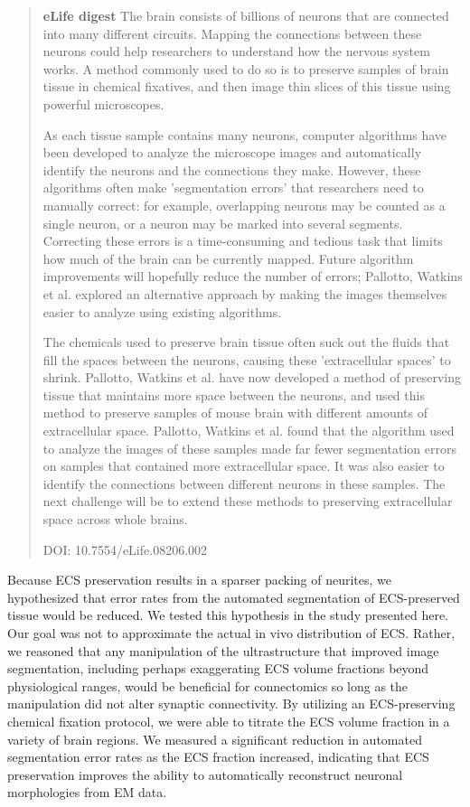 \documentclass{article}
\begin{document}
\begin{quote}
\noindent\textbf{eLife digest} The brain consists of billions of neurons that are connected into many different circuits. Mapping the connections between these neurons could help researchers to understand how the nervous system works. A method commonly used to do so is to preserve samples of brain tissue in chemical fixatives, and then image thin slices of this tissue using powerful microscopes.

As each tissue sample contains many neurons, computer algorithms have been developed to analyze the microscope images and automatically identify the neurons and the connections they make. However, these algorithms often make ’segmentation errors’ that researchers need to manually correct: for example, overlapping neurons may be counted as a single neuron, or a neuron may be marked into several segments. Correcting these errors is a time-consuming and tedious task that limits how much of the brain can be currently mapped. Future algorithm improvements will hopefully reduce the number of errors; Pallotto, Watkins et al. explored an alternative approach by making the images themselves easier to analyze using existing algorithms.

The chemicals used to preserve brain tissue often suck out the fluids that fill the spaces between the neurons, causing these ’extracellular spaces’ to shrink. Pallotto, Watkins et al. have now developed a method of preserving tissue that maintains more space between the neurons, and used this method to preserve samples of mouse brain with different amounts of extracellular space. Pallotto, Watkins et al. found that the algorithm used to analyze the images of these samples made far fewer segmentation errors on samples that contained more extracellular space. It was also easier to identify the connections between different neurons in these samples. The next challenge will be to extend these methods to preserving extracellular space across whole brains.

\noindent DOI: 10.7554/eLife.08206.002
\end{quote}

Because ECS preservation results in a sparser packing of neurites, we hypothesized that error rates from the automated segmentation of ECS-preserved tissue would be reduced. We tested this hypothesis in the study presented here. Our goal was not to approximate the actual in vivo distribution of ECS. Rather, we reasoned that any manipulation of the ultrastructure that improved image segmentation, including perhaps exaggerating ECS volume fractions beyond physiological ranges, would be beneficial for connectomics so long as the manipulation did not alter synaptic connectivity. By utilizing an ECS-preserving chemical fixation protocol, we were able to titrate the ECS volume fraction in a variety of brain regions. We measured a significant reduction in automated segmentation error rates as the ECS fraction increased, indicating that ECS preservation improves the ability to automatically reconstruct neuronal morphologies from EM data.
\end{document}
